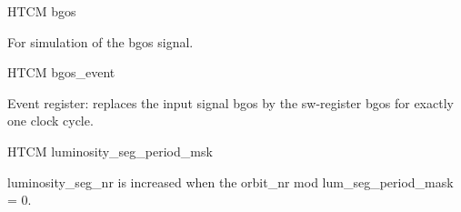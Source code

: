 \begin{register}{H}{TCM bgos}{}%
	\label{bgos}%
	\regnewline%

	\begin{regdesc}
	\begin{reglist}
 		\item [bgos] For simulation of the bgos signal.
	\end{reglist}
	\end{regdesc}
\end{register}

\begin{register}{H}{TCM bgos\_event}{}%
	\label{bgos_event}%
	\regnewline%

	\begin{regdesc}
	\begin{reglist}
 		\item [bgos\_event] Event register: replaces the input signal bgos by the sw-register bgos for exactly one clock cycle.
	\end{reglist}
	\end{regdesc}
\end{register}

\begin{register}{H}{TCM luminosity\_seg\_period\_msk}{}%
	\label{luminosity_seg_period_msk}%

	\begin{regdesc}
	\begin{reglist}
 		\item [luminosity\_seg\_period\_msk] luminosity\_seg\_nr is increased when the orbit\_nr mod lum\_seg\_period\_mask = 0.
	\end{reglist}
	\end{regdesc}
\end{register}

